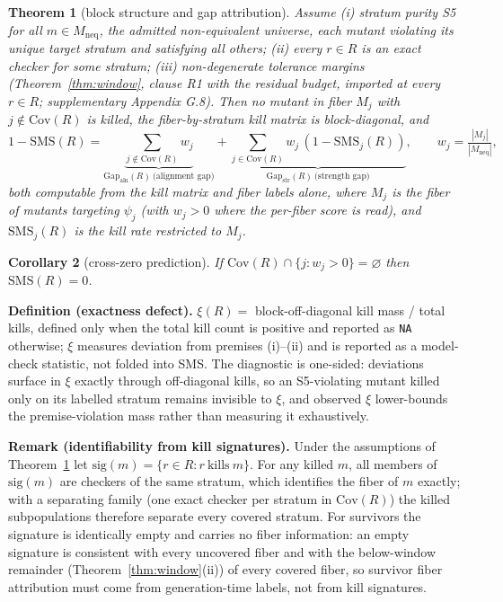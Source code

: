 \documentclass[review,12pt,authoryear]{elsarticle}
\newtheorem{theorem}{Theorem}
\newtheorem{corollary}[theorem]{Corollary}
\begin{document}
\begin{theorem}[block structure and gap attribution]\label{thm:gap}
Assume (i) stratum purity S5 for all $m \in M_{\mathrm{neq}}$, the
admitted non-equivalent universe, each mutant violating its unique
target stratum and satisfying all others; (ii) every $r \in R$ is an
exact checker for some stratum; (iii) non-degenerate tolerance margins
(Theorem~\ref{thm:window}, clause R1 with the residual budget, imported
at every $r \in R$; supplementary Appendix G.8). Then no mutant in fiber
$M_j$ with $j \notin \mathrm{Cov}(R)$ is killed, the fiber-by-stratum
kill matrix is block-diagonal, and
\[ 1 - \mathrm{SMS}(R) = \underbrace{\textstyle\sum_{j \notin \mathrm{Cov}(R)} w_j}_{\mathrm{Gap}_{\mathrm{aln}}(R)\ \text{(alignment gap)}}
 + \underbrace{\textstyle\sum_{j \in \mathrm{Cov}(R)} w_j\,(1 - \mathrm{SMS}_j(R))}_{\mathrm{Gap}_{\mathrm{str}}(R)\ \text{(strength gap)}},
 \qquad w_j = \tfrac{|M_j|}{|M_{\mathrm{neq}}|}, \]
both computable from the kill matrix and fiber labels alone, where $M_j$
is the fiber of mutants targeting $\psi_j$ (with $w_j > 0$ where the
per-fiber score is read), and $\mathrm{SMS}_j(R)$ is the kill rate
restricted to $M_j$.
\end{theorem}

\begin{corollary}[cross-zero prediction]\label{cor:zero}
If $\mathrm{Cov}(R) \cap \{j : w_j > 0\} = \varnothing$ then
$\mathrm{SMS}(R) = 0$.
\end{corollary}

\textbf{Definition (exactness defect).} $\xi(R) =$ block-off-diagonal
kill mass / total kills, defined only when the total kill count is
positive and reported as \texttt{NA} otherwise; $\xi$ measures deviation
from premises (i)--(ii) and is reported as a model-check statistic, not
folded into SMS. The diagnostic is one-sided: deviations surface in
$\xi$ exactly through off-diagonal kills, so an S5-violating mutant
killed only on its labelled stratum remains invisible to $\xi$, and
observed $\xi$ lower-bounds the premise-violation mass rather than
measuring it exhaustively.

\textbf{Remark (identifiability from kill signatures).} Under the
assumptions of Theorem~\ref{thm:gap} let
$\mathrm{sig}(m) = \{r \in R : r\ \text{kills}\ m\}$. For any killed
$m$, all members of $\mathrm{sig}(m)$ are checkers of the same stratum,
which identifies the fiber of $m$ exactly; with a separating family (one
exact checker per stratum in $\mathrm{Cov}(R)$) the killed
subpopulations therefore separate every covered stratum. For survivors
the signature is identically empty and carries no fiber information: an
empty signature is consistent with every uncovered fiber and with the
below-window remainder (Theorem~\ref{thm:window}(ii)) of every covered
fiber, so survivor fiber attribution must come from generation-time
labels, not from kill signatures.
\end{document}

